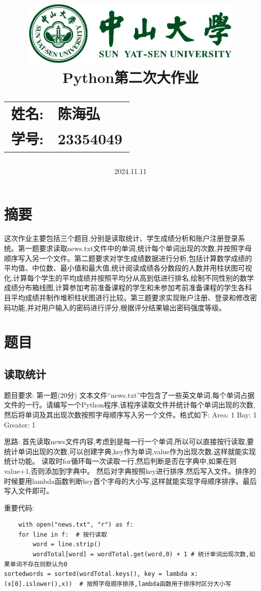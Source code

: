 \documentclass[12pt,a4paper,oneside]{article}
\author{}
\title{
    \vspace*{-2cm} %
    \includegraphics[width=0.8\textwidth]{SYSULogo.pdf} \\[1em]
    \vfill %
    \LARGE \textbf{Python第二次大作业} \\[1em]
    \Large
    \begin{tabular}{rl}
        \textbf{姓名:} & \textbf{陈海弘} \\
        \textbf{学号:} & \textbf{23354049}
    \end{tabular}
    \vfill %
}
\date{\Large 2024.11.11}
\begin{document}
\maketitle

\newpage
\tableofcontents
\newpage
\section{摘要}
这次作业主要包括三个题目,分别是读取统计、学生成绩分析和账户注册登录系统。第一题要求读取news.txt文件中的单词,统计每个单词出现的次数,并按照字母顺序写入另一个文件。第二题要求对学生成绩数据进行分析,包括计算数学成绩的平均值、中位数、最小值和最大值,统计阅读成绩各分数段的人数并用柱状图可视化,计算每个学生的平均成绩并按照平均分从高到低进行排名,绘制不同性别的数学成绩分布箱线图,计算参加考前准备课程的学生和未参加考前准备课程的学生各科目平均成绩并制作堆积柱状图进行比较。第三题要求实现账户注册、登录和修改密码功能,并对用户输入的密码进行评分,根据评分结果输出密码强度等级。
\section{题目}
\subsection{读取统计}
题目要求:
第一题(20分)
文本文件“news.txt”中包含了一些英文单词,每个单词占据文件的一行。请编写一个Python程序,该程序读取文件并统计每个单词出现的次数,然后将单词及其出现次数按照字母顺序写入另一个文件。格式如下:
Area: 1
Bay: 1
Greater: 1

思路:
首先读取news文件内容,考虑到是每一行一个单词,所以可以直接按行读取,要统计单词出现的次数,可以创建字典,key作为单词,value作为出现次数,这样就能实现统计功能。
读取时for循环每一次读取一行,然后判断是否在字典中,如果在则value+1,否则添加到字典中。
然后对字典按照key进行排序,然后写入文件。排序的时候要用lambda函数判断key首个字母的大小写,这样就能实现字母顺序排序。最后写入文件即可。

重要代码:
\begin{lstlisting}
    with open("news.txt", "r") as f:
    for line in f:  # 按行读取
        word = line.strip()
        wordTotal[word] = wordTotal.get(word,0) + 1 # 统计单词出现次数,如果单词不存在则默认为0
sortedwords = sorted(wordTotal.keys(), key = lambda x: (x[0].islower(),x))  # 按照字母顺序排序,lambda函数用于排序时区分大小写
\end{lstlisting}
\end{document}

